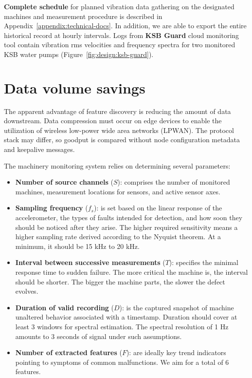 \textbf{Complete schedule} for planned vibration data gathering on the designated machines and measurement procedure is described in Appendix~\ref{appendix:technical-docs}. In addition, we are able to export the entire historical record at hourly intervals. Logs from \textbf{KSB Guard} cloud monitoring tool contain vibration rms velocities and frequency spectra for two monitored KSB water pumps (Figure~\ref{fig:design:ksb-guard}).


\section{Data volume savings}
The apparent advantage of feature discovery is reducing the amount of data downstream. Data compression must occur on edge devices to enable the utilization of wireless low-power wide area networks (LPWAN). The protocol stack may differ, so goodput is compared without node configuration metadata and keepalive messages. 

The machinery monitoring system relies on determining several parameters:
\begin{itemize}
\itemsep0pt
\item \textbf{Number of source channels} ($S$): comprises the number of monitored machines, measurement locations for sensors, and active sensor axes.
\item \textbf{Sampling frequency} ($f_s$): is set based on the linear response of the accelerometer, the types of faults intended for detection, and how soon they should be noticed after they arise. The higher required sensitivity means a higher sampling rate derived according to the Nyquist theorem. At a minimum, it should be 15 kHz to 20 kHz.
\item \textbf{Interval between successive measurements} ($T$): specifies the minimal response time to sudden failure. The more critical the machine is, the interval should be shorter. The bigger the machine parts, the slower the defect evolves.
\item \textbf{Duration of valid recording} ($D$): is the captured snapshot of machine unaltered behavior associated with a timestamp. Duration should cover at least 3 windows for spectral estimation. The spectral resolution of 1 Hz amounts to 3 seconds of signal under such assumptions.
\item \textbf{Number of extracted features} ($F$): are ideally key trend indicators pointing to symptoms of common malfunctions. We aim for a total of 6 features.
\end{itemize}

